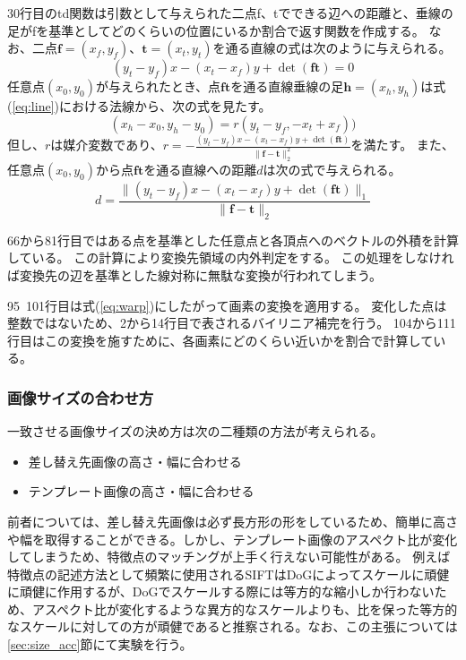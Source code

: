 30行目のtd関数は引数として与えられた二点f、tでできる辺への距離と、垂線の足がfを基準としてどのくらいの位置にいるか割合で返す関数を作成する。
なお、二点$\bm{f}=(x_f, y_f)$、$\bm{t}=(x_t, y_t)$を通る直線の式は次のように与えられる。
\begin{equation} \label{eq:line}
(y_t - y_f) x - (x_t - x_f) y + \det{(\bm{f}\bm{t})} = 0
\end{equation}
任意点$(x_0, y_0)$が与えられたとき、点$\bm{ft}$を通る直線垂線の足$\bm{h}=(x_h, y_h)$は式(\ref{eq:line})における法線から、次の式を見たす。
\begin{equation}
(x_h - x_0, y_h - y_0) = r (y_t - y_f, -x_t + x_f))
\end{equation}
但し、$r$は媒介変数であり、$r=-\frac{(y_t - y_f) x - (x_t - x_f) y + \det{(\bm{f}\bm{t})}}{\|\bm{f}-\bm{t}\|_2^2}$を満たす。
また、任意点$(x_0, y_0)$から点$\bm{ft}$を通る直線への距離$d$は次の式で与えられる。
\begin{equation}
d = \frac{\|(y_t - y_f) x - (x_t - x_f) y + \det{(\bm{f}\bm{t})\|_1}}{\|\bm{f}-\bm{t}\|_2}
\end{equation}

66から81行目ではある点を基準とした任意点と各頂点へのベクトルの外積を計算している。
この計算により変換先領域の内外判定をする。
この処理をしなければ変換先の辺を基準とした線対称に無駄な変換が行われてしまう。

95~101行目は式(\ref{eq:warp})にしたがって画素の変換を適用する。
変化した点は整数ではないため、2から14行目で表されるバイリニア補完を行う。
104から111行目はこの変換を施すために、各画素にどのくらい近いかを割合で計算している。

\subsubsection{画像サイズの合わせ方}\label{sec:size}
一致させる画像サイズの決め方は次の二種類の方法が考えられる。
\begin{itemize}
    \item 差し替え先画像の高さ・幅に合わせる
    \item テンプレート画像の高さ・幅に合わせる
\end{itemize}

前者については、差し替え先画像は必ず長方形の形をしているため、簡単に高さや幅を取得することができる。しかし、テンプレート画像のアスペクト比が変化してしまうため、特徴点のマッチングが上手く行えない可能性がある。
例えば特徴点の記述方法として頻繁に使用されるSIFT\cite{sift}はDoGによってスケールに頑健に頑健に作用するが、DoGでスケールする際には等方的な縮小しか行わないため、アスペクト比が変化するような異方的なスケールよりも、比を保った等方的なスケールに対しての方が頑健であると推察される。なお、この主張については\ref{sec:size_acc}節にて実験を行う。

